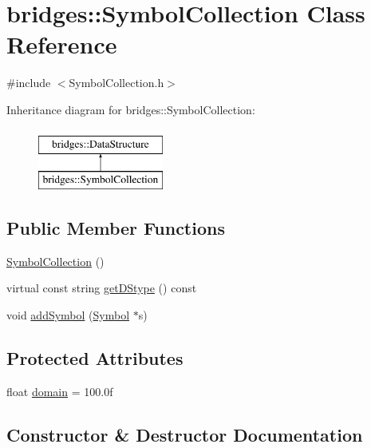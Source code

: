\hypertarget{classbridges_1_1_symbol_collection}{}\section{bridges\+:\+:Symbol\+Collection Class Reference}
\label{classbridges_1_1_symbol_collection}


{\ttfamily \#include $<$Symbol\+Collection.\+h$>$}

Inheritance diagram for bridges\+:\+:Symbol\+Collection\+:\begin{figure}[H]
\begin{center}
\leavevmode
\includegraphics[height=2.000000cm]{classbridges_1_1_symbol_collection}
\end{center}
\end{figure}
\subsection*{Public Member Functions}
\begin{DoxyCompactItemize}
\item 
\mbox{\hyperlink{classbridges_1_1_symbol_collection_ae3b3dd944594e1ebac451c0557a45f80}{Symbol\+Collection}} ()
\item 
virtual const string \mbox{\hyperlink{classbridges_1_1_symbol_collection_a9bc5abacaf6f90b2d013963311c8052e}{get\+D\+Stype}} () const
\item 
void \mbox{\hyperlink{classbridges_1_1_symbol_collection_acdc101f6651becc430e281ed967ddedf}{add\+Symbol}} (\mbox{\hyperlink{classbridges_1_1_symbol}{Symbol}} $\ast$s)
\end{DoxyCompactItemize}
\subsection*{Protected Attributes}
\begin{DoxyCompactItemize}
\item 
float \mbox{\hyperlink{classbridges_1_1_symbol_collection_a9387df86c54863524ab4779ff8458c7a}{domain}} = 100.\+0f
\end{DoxyCompactItemize}


\subsection{Constructor \& Destructor Documentation}
\mbox{\label{classbridges_1_1_symbol_collection_ae3b3dd944594e1ebac451c0557a45f80}} 
